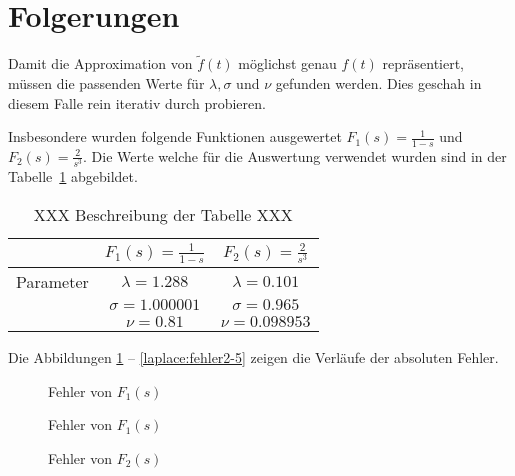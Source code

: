 %
%
%


\section{Folgerungen
\label{laplace:section:folgerungen}}
Damit die Approximation von $\tilde{f}(t)$ möglichst genau $f(t)$ repräsentiert,
müssen die passenden Werte für $\lambda, \sigma $ und $\nu $ gefunden werden. 
Dies geschah in diesem Falle rein iterativ durch probieren.

Insbesondere wurden folgende Funktionen ausgewertet $ F_{1}(s)=\frac{1}{1-s} $ und $F_{2}(s) = \frac{2}{s^{3}}$. 
Die Werte welche für die Auswertung verwendet wurden sind in der Tabelle~\ref{laplace:parametertabelle} abgebildet.

\begin{table}
\centering
\begin{tabular}[c]{c|c|c}
& $F_{1}(s)=\frac{1}{1-s}$ & $F_{2}(s) = \frac{2}{s^{3}}$ \\
\hline
Parameter & $\lambda=1.288$ & $\lambda=0.101$ \\
& $\sigma=1.000001$ & $\sigma=0.965$ \\
& $\nu=0.81$ & $\nu=0.098953$ \\
\end{tabular}
\caption{XXX Beschreibung der Tabelle XXX
\label{laplace:parametertabelle}}
\end{table}
Die Abbildungen \ref{laplace:fehlerf1} -- \ref{laplace:fehler2-5} zeigen die Verläufe der absoluten Fehler.

\begin{figure}
\centering
\caption{Fehler von $F_{1}(s)$
\label{laplace:fehlerf1}
}
\end{figure}

\begin{figure}
\centering
\caption{Fehler von $F_{1}(s)$
\label{laplace:fehlerf1-5}
}
\end{figure}

\begin{figure}
\centering
\caption{Fehler von $F_{2}(s)$
\label{laplace:fehlerf2}
}
\end{figure}

